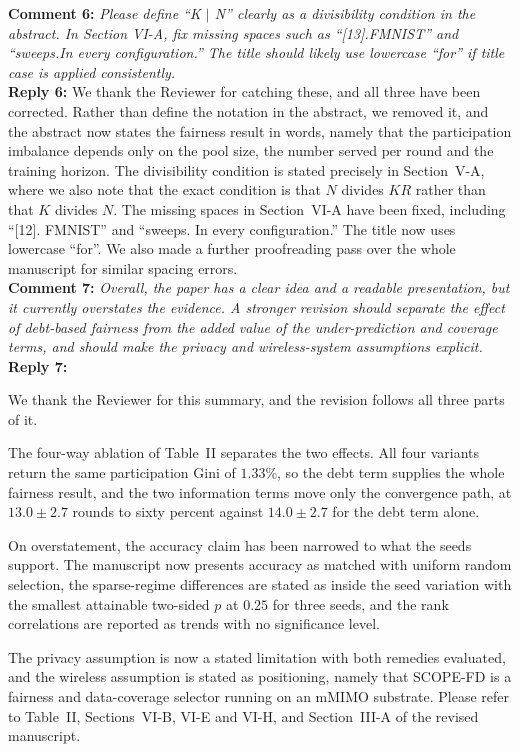 \documentclass[10pt]{article}
\begin{document}
\noindent
\textbf{Comment 6:} \textit{Please define ``K $|$ N'' clearly as a divisibility condition in the abstract. In Section VI-A, fix missing spaces such as ``[13].FMNIST'' and ``sweeps.In every configuration.'' The title should likely use lowercase ``for'' if title case is applied consistently.} \\
\noindent
\textbf{Reply 6:} {We thank the Reviewer for catching these, and all three have been corrected. Rather than define the notation in the abstract, we removed it, and the abstract now states the fairness result in words, namely that the participation imbalance depends only on the pool size, the number served per round and the training horizon. The divisibility condition is stated precisely in Section~V-A, where we also note that the exact condition is that $N$ divides $KR$ rather than that $K$ divides $N$. The missing spaces in Section~VI-A have been fixed, including ``[12]. FMNIST'' and ``sweeps. In every configuration.'' The title now uses lowercase ``for''. We also made a further proofreading pass over the whole manuscript for similar spacing errors.}\\

\noindent
\textbf{Comment 7:} \textit{Overall, the paper has a clear idea and a readable presentation, but it currently overstates the evidence. A stronger revision should separate the effect of debt-based fairness from the added value of the under-prediction and coverage terms, and should make the privacy and wireless-system assumptions explicit.} \\
\noindent
\textbf{Reply 7:} {We thank the Reviewer for this summary, and the revision follows all three parts of it.

The four-way ablation of Table~II separates the two effects. All four variants return the same participation Gini of $1.33\%$, so the debt term supplies the whole fairness result, and the two information terms move only the convergence path, at $13.0 \pm 2.7$ rounds to sixty percent against $14.0 \pm 2.7$ for the debt term alone.

On overstatement, the accuracy claim has been narrowed to what the seeds support. The manuscript now presents accuracy as matched with uniform random selection, the sparse-regime differences are stated as inside the seed variation with the smallest attainable two-sided $p$ at $0.25$ for three seeds, and the rank correlations are reported as trends with no significance level.

The privacy assumption is now a stated limitation with both remedies evaluated, and the wireless assumption is stated as positioning, namely that SCOPE-FD is a fairness and data-coverage selector running on an mMIMO substrate. Please refer to Table~II, Sections~VI-B, VI-E and VI-H, and Section~III-A of the revised manuscript.}\\
\end{document}
